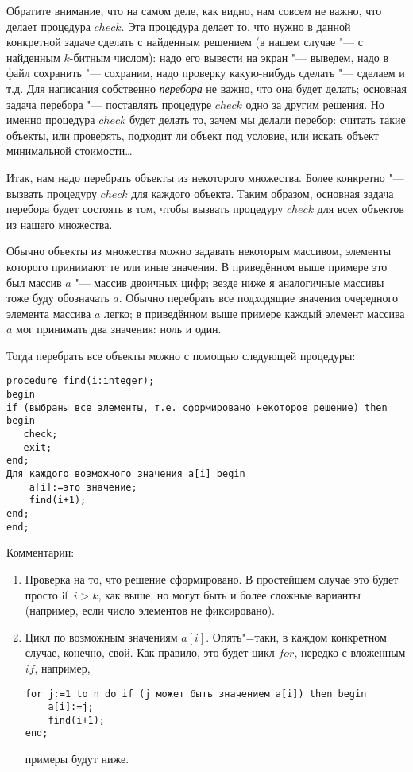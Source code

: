 Обратите внимание, что на самом деле, как видно, нам совсем не важно, что делает процедура $check$. Эта процедура делает то, что нужно в данной конкретной задаче сделать с 
найденным решением (в нашем случае "--- с найденным $k$-битным числом): надо его 
вывести на экран "--- выведем, надо в файл сохранить "--- сохраним, надо проверку 
какую-нибудь сделать "--- сделаем и т.д. Для написания  собственно \textit{перебора} не важно, что она будет делать; основная задача перебора "--- поставлять процедуре $check$ одно за другим решения. Но именно процедура $check$ будет делать то, зачем мы делали 
перебор: считать такие объекты, или проверять, подходит ли объект под условие, или 
искать объект минимальной стоимости\dots


Итак, нам надо перебрать объекты из некоторого множества. Более конкретно "---
вызвать процедуру $check$ для каждого объекта. Таким образом, 
основная задача перебора будет состоять в том, чтобы вызвать процедуру $check$ 
для всех объектов из нашего множества.

Обычно объекты из множества можно задавать некоторым массивом, элементы 
которого принимают те или иные значения. В приведённом выше примере это был 
массив $a$ "--- массив двоичных цифр; везде ниже я аналогичные массивы тоже буду 
обозначать $a$. Обычно перебрать все подходящие значения очередного элемента 
массива $a$ легко; в приведённом выше примере каждый элемент массива $a$ мог 
принимать два значения: ноль и один.

Тогда перебрать все объекты можно с помощью следующей процедуры:

\begin{codesampleo}\begin{verbatim}
procedure find(i:integer);
begin
if (выбраны все элементы, т.е. сформировано некоторое решение) then begin
   check;
   exit;
end;
Для каждого возможного значения a[i] begin
    a[i]:=это значение;
    find(i+1);
end;
end;
\end{verbatim}
\end{codesampleo}

Комментарии:
\begin{enumerate}
\item Проверка на то, что решение сформировано. В простейшем случае это будет 
просто if~$i>k$, как выше, но могут быть и более сложные варианты (например, если 
число элементов не фиксировано).
\item Цикл по возможным значениям $a[i]$. Опять"=таки, в каждом конкретном случае, 
конечно, свой. Как правило, это будет цикл $for$, нередко с вложенным $if$, например,
\begin{codesampleo}\begin{verbatim}
for j:=1 to n do if (j может быть значением a[i]) then begin
    a[i]:=j;
    find(i+1);
end;
\end{verbatim}
\end{codesampleo}
примеры будут ниже.
\end{enumerate}


